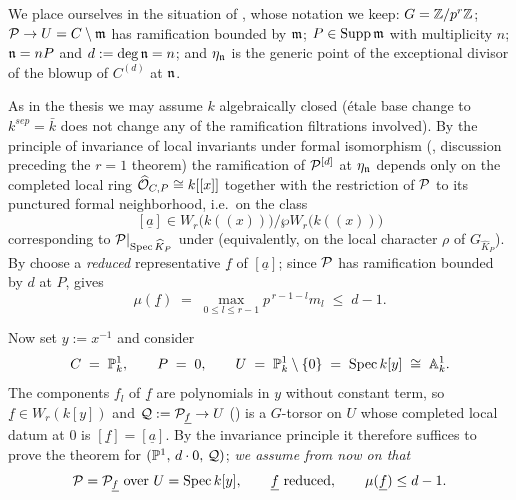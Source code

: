 \documentclass[11pt]{article}
\newcommand{\wv}[1]{\underline{#1}}                 %
\begin{document}
We place ourselves in the situation of
, whose
notation we keep: $G=\mathbb{Z}/p^r\mathbb{Z}$; $\mathcal{P}\to U=C\setminus\mathfrak{m}$ has ramification
bounded by $\mathfrak{m}$; $P\in\operatorname{Supp}\mathfrak{m}$ with multiplicity $n$;
$\mathfrak{n}=nP$ and $d:=\deg\mathfrak{n}=n$; and $\eta_{\mathfrak{n}}$ is the generic point of
the exceptional divisor of the blowup of $C^{(d)}$ at $\mathfrak{n}$.

As in the thesis we may assume $k$ algebraically closed (\'etale base
change to $k^{sep}=\bar k$ does not change any of the ramification
filtrations involved).  By the principle of invariance of local invariants
under formal isomorphism (,
discussion preceding the $r=1$ theorem) the ramification of $\mathcal{P}^{[d]}$ at
$\eta_{\mathfrak{n}}$ depends only on the completed local ring
$\widehat{\mathcal{O}}_{C,P}\cong k[[x]]$ together with the restriction of $\mathcal{P}$ to
its punctured formal neighborhood, i.e.\ on the class
\[
[\wv a]\in W_r\big(k((x))\big)/\wp W_r\big(k((x))\big)
\]
corresponding to $\mathcal{P}|_{\operatorname{Spec}\widehat K_P}$ under
 (equivalently, on the local character $\rho$ of
$G_{\widehat K_P}$).  By  choose a \emph{reduced}
representative $\wv f$ of $[\wv a]$; since $\mathcal{P}$ has ramification bounded
by $d$ at $P$,  gives
\begin{equation}\label{eq:bound}
\mu(\wv f)\;=\;\max_{0\le l\le r-1}p^{\,r-1-l}m_l\;\le\;d-1 .
\end{equation}

Now set $y:=x^{-1}$ and consider
\[
C\;=\;\mathbb{P}^1_k,\qquad P\;=\;0,\qquad
U\;=\;\mathbb{P}^1_k\setminus\{0\}\;=\;\operatorname{Spec} k[y]\;\cong\;\mathbb{A}^1_k .
\]
The components $f_l$ of $\wv f$ are polynomials in $y$ without constant
term, so $\wv f\in W_r(k[y])$ and
$\cQ:=\cP_{\wv f}\to U$ () is a $G$-torsor on $U$ whose
completed local datum at $0$ is $[\wv f]=[\wv a]$.  By the invariance
principle it therefore suffices to prove the theorem for
$(\mathbb{P}^1,\,d\cdot 0,\,\mathcal{Q})$; \emph{we assume from now on that}
\[
\cP=\cP_{\wv f}\ \text{over}\ U=\Spec k[y],\qquad
\wv f\ \text{reduced},\qquad \mu(\wv f)\le d-1 .
\]
\end{document}
